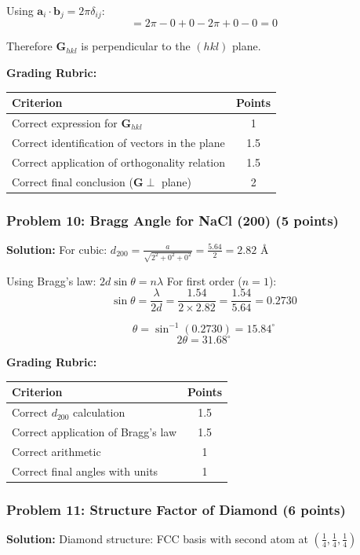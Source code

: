 \documentclass[12pt,a4paper]{article}
\begin{document}
Using $\mathbf{a}_i \cdot \mathbf{b}_j = 2\pi \delta_{ij}$:
\[= 2\pi - 0 + 0 - 2\pi + 0 - 0 = 0\]

Therefore $\mathbf{G}_{hkl}$ is perpendicular to the $(hkl)$ plane.

\textbf{Grading Rubric:}
\begin{table}[h]
\centering
\begin{tabular}{|p{10cm}|c|}
\hline
\textbf{Criterion} & \textbf{Points} \\
\hline
Correct expression for $\mathbf{G}_{hkl}$ & 1 \\
Correct identification of vectors in the plane & 1.5 \\
Correct application of orthogonality relation & 1.5 \\
Correct final conclusion ($\mathbf{G} \perp$ plane) & 2 \\
\hline
\end{tabular}
\end{table}

\subsubsection*{Problem 10: Bragg Angle for NaCl (200) (5 points)}
\textbf{Solution:}
For cubic: $d_{200} = \frac{a}{\sqrt{2^2 + 0^2 + 0^2}} = \frac{5.64}{2} = 2.82 \text{ \AA}$

Using Bragg's law: $2d\sin\theta = n\lambda$
For first order ($n=1$):
\[\sin\theta = \frac{\lambda}{2d} = \frac{1.54}{2 \times 2.82} = \frac{1.54}{5.64} = 0.2730\]

\[\theta = \sin^{-1}(0.2730) = 15.84^\circ\]
\[2\theta = 31.68^\circ\]

\textbf{Grading Rubric:}
\begin{table}[h]
\centering
\begin{tabular}{|p{10cm}|c|}
\hline
\textbf{Criterion} & \textbf{Points} \\
\hline
Correct $d_{200}$ calculation & 1.5 \\
Correct application of Bragg's law & 1.5 \\
Correct arithmetic & 1 \\
Correct final angles with units & 1 \\
\hline
\end{tabular}
\end{table}

\subsubsection*{Problem 11: Structure Factor of Diamond (6 points)}
\textbf{Solution:}
Diamond structure: FCC basis with second atom at $(\frac{1}{4}, \frac{1}{4}, \frac{1}{4})$
\end{document}
